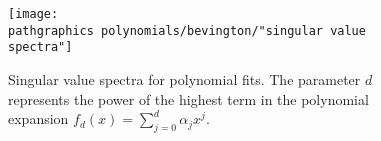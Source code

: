 \begin{figure}[t]
	\texttt{[image: \\pathgraphics polynomials/bevington/"singular value spectra"]}
	\caption{Singular value spectra for polynomial fits. The parameter $d$ represents the power of the highest term in the polynomial expansion $f_{d}(x) = \sum_{j=0}^{d}\alpha_{j}x^{j}$.}
\end{figure}

\endinput  %

